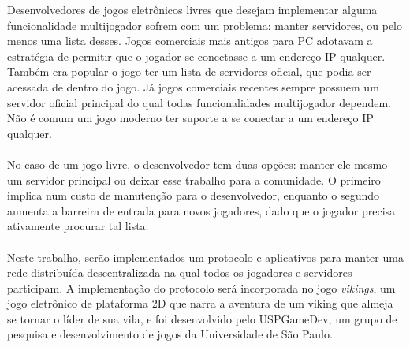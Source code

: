 \documentclass[11pt,twoside,a4paper]{book}
\begin{document}
Desenvolvedores de jogos eletrônicos livres que desejam implementar alguma
funcionalidade multijogador sofrem com um problema: manter servidores, ou pelo
menos uma lista desses. Jogos comerciais mais antigos para PC adotavam a
estratégia de permitir que o jogador se conectasse a um endereço IP qualquer.
Também era popular o jogo ter um lista de servidores oficial, que podia ser
acessada de dentro do jogo. Já jogos comerciais recentes sempre possuem um
servidor oficial principal do qual todas funcionalidades multijogador dependem.
Não é comum um jogo moderno ter suporte a se conectar a um endereço IP qualquer.
\\
\\
No caso de um jogo livre, o desenvolvedor tem duas opções: manter ele mesmo um
servidor principal ou deixar esse trabalho para a comunidade. O primeiro implica
num custo de manutenção para o desenvolvedor, enquanto o segundo aumenta a
barreira de entrada para novos jogadores, dado que o jogador precisa ativamente
procurar tal lista.
\\
\\
Neste trabalho, serão implementados um protocolo e aplicativos para manter uma
rede distribuída descentralizada na qual todos os jogadores e servidores
participam. A implementação do protocolo será incorporada no jogo \textit{vikings},
um jogo eletrônico de plataforma 2D que narra a aventura de um viking que almeja
se tornar o líder de sua vila, e foi desenvolvido pelo USPGameDev, um grupo de
pesquisa e desenvolvimento de jogos da Universidade de São Paulo.


\def\cyclic#1{\langle #1 \rangle}

\newcommand\definicao[2]{
    \stepcounter{defcnt}
    \vspace{0.5cm}
    \vbox{
    \textbf{Definição \thedefcnt \hspace{1cm} #1} \\ #2
    \begin{center}
        $ \square $
    \end{center}
}
}
\newcommand\notacao{
    \textbf{Notação} \hspace{0.2cm}
}

\tableofcontents    %
\end{document}
